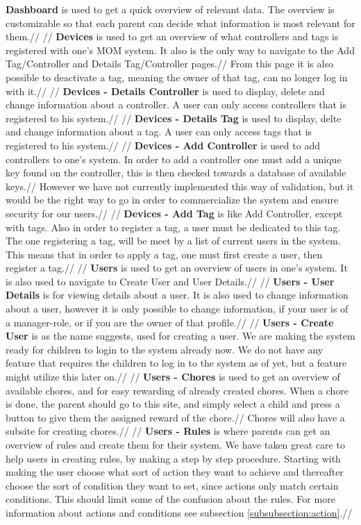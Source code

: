 \textbf{Dashboard} is used to get a quick overview of relevant data. The overview is customizable so that each parent can decide what information is most relevant for them.//
//
\textbf{Devices} is used to get an overview of what controllers and tags is registered with one's MOM system. It also is the only way to navigate to the Add Tag/Controller and Details Tag/Controller pages.//
From this page it is also possible to deactivate a tag, meaning the owner of that tag, can no longer log in with it.//
//
\textbf{Devices - Details Controller} is used to display, delete and change information about a controller. A user can only access controllers that is registered to his system.//
//
\textbf{Devices - Details Tag} is used to display, delte and change information about a tag. A user can only access tags that is registered to his system.//
//
\textbf{Devices - Add Controller} is used to add controllers to one's system. In order to add a controller one must add a unique key found on the controller, this is then checked towards a database of available keys.//
However we have not currently implemented this way of validation, but it would be the right way to go in order to commercialize the system and ensure security for our users.//
//
\textbf{Devices - Add Tag} is like Add Controller, except with tags. Also in order to register a tag, a user must be dedicated to this tag. The one registering a tag, will be meet by a list of current users in the system. This means that in order to apply a tag, one must first create a user, then register a tag.//
//
\textbf{Users} is used to get an overview of users in one's system. It is also used to navigate to Create User and User Details.//
//
\textbf{Users - User Details} is for viewing details about a user. It is also used to change information about a user, however it is only possible to change information, if your user is of a manager-role, or if you are the owner of that profile.//
//
\textbf{Users - Create User} is as the name suggests, used for creating a user. We are making the system ready for children to login to the system already now. We do not have any feature that requires the children to log in to the system as of yet, but a feature might utilize this later on.//
//
\textbf{Users - Chores} is used to get an overview of available chores, and for easy rewarding of already created chores. When a chore is done, the parent should go to this site, and simply select a child and press a button to give them the assigned reward of the chore.//
Chores will also have a subsite for creating chores.//
//
\textbf{Users - Rules} is where parents can get an overview of rules and create them for their system. We have taken great care to help users in creating rules, by making a step by step procedure. Starting with making the user choose what sort of action they want to achieve and thereafter choose the sort of condition they want to set, since actions only match certain conditions. This should limit some of the confusion about the rules. For more information about actions and conditions see subsection \vref{subsubsection:action}.//
